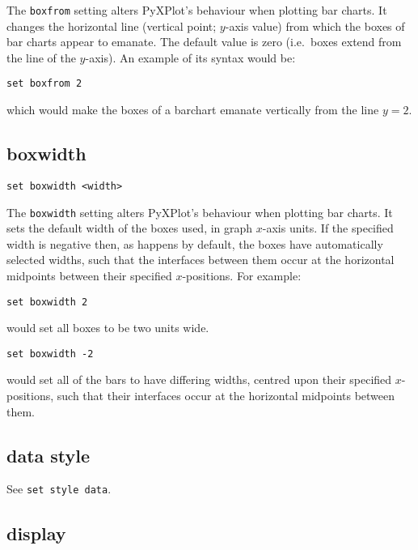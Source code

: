 The {\tt boxfrom} setting alters PyXPlot's behaviour when plotting bar charts.
It changes the horizontal line (vertical point; $y$-axis value) from which the
boxes of bar charts appear to emanate.  The default value is zero (i.e.\ boxes
extend from the line of the $y$-axis). An example of its syntax would be:

\begin{verbatim}
set boxfrom 2
\end{verbatim}

\noindent which would make the boxes of a barchart emanate vertically from the line $y=2$.


\subsection{boxwidth}

\begin{verbatim}
set boxwidth <width>
\end{verbatim}

The {\tt boxwidth} setting alters PyXPlot's behaviour when plotting bar charts.
It sets the default width of the boxes used, in graph $x$-axis units.  If the
specified width is negative then, as happens by default, the boxes have
automatically selected widths, such that the interfaces between them occur at
the horizontal midpoints between their specified $x$-positions.  For example:

\begin{verbatim}
set boxwidth 2
\end{verbatim}

\noindent would set all boxes to be two units wide.

\begin{verbatim}
set boxwidth -2
\end{verbatim}

\noindent would set all of the bars to have differing widths, centred upon their
specified $x$-positions, such that their interfaces occur at the horizontal
midpoints between them.


\subsection{data style}

See {\tt set style data}.

\subsection{display}

